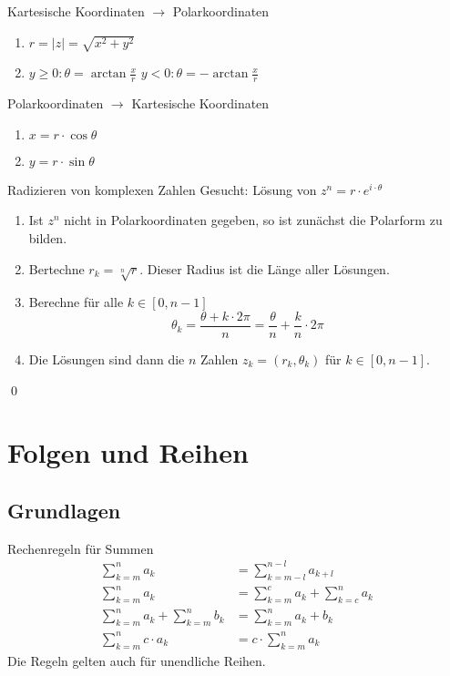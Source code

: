 \documentclass[german]{spicker}
\renewcommand{\abs}[1]{\left| #1 \right|}
\begin{document}
\begin{algo}{Kartesische Koordinaten $\to$ Polarkoordinaten}
    \begin{enumerate}
        \item $r = \abs{z} = \sqrt{x^2 + y^2}$
        \item
              \subitem $y \geq 0 : \theta = \arctan \frac{x}{r}$
              \subitem $y < 0 : \theta = -\arctan \frac{x}{r}$
    \end{enumerate}
\end{algo}

\begin{algo}{Polarkoordinaten $\to$ Kartesische Koordinaten}
    \begin{enumerate}
        \item $x = r \cdot \cos \theta$
        \item $y = r \cdot \sin \theta$
    \end{enumerate}
\end{algo}

\begin{algo}{Radizieren von komplexen Zahlen}
    Gesucht: Lösung von $z^n = r \cdot e^{i\cdot \theta}$
    \begin{enumerate}
        \item Ist $z^n$ nicht in Polarkoordinaten gegeben, so ist zunächst die Polarform zu bilden.
        \item Bertechne $r_k = \sqrt[n]{r}$. Dieser Radius ist die Länge aller Lösungen.
        \item Berechne für alle $k \in [0, n-1]$
              $$
                  \theta_k = \frac{\theta + k\cdot 2\pi}{n} = \frac{\theta}{n} + \frac{k}{n} \cdot 2\pi
              $$
        \item Die Lösungen sind dann die $n$ Zahlen $z_k = (r_k, \theta_k)$ für $k \in [0, n-1]$.
    \end{enumerate}
    \qed
\end{algo}

\section{Folgen und Reihen}

\subsection{Grundlagen}
\begin{bonus}{Rechenregeln für Summen}
    $$
        \begin{aligned}
            \sum_{k=m}^n a_k                    & = \sum_{k=m-l}^{n-l} a_{k+l}          \\
            \sum_{k=m}^n a_k                    & = \sum_{k=m}^c a_k + \sum_{k=c}^n a_k \\
            \sum_{k=m}^n a_k + \sum_{k=m}^n b_k & = \sum_{k=m}^n a_k + b_k              \\
            \sum_{k=m}^n c\cdot a_k             & = c\cdot\sum_{k=m}^n a_k
        \end{aligned}
    $$
    Die Regeln gelten auch für unendliche Reihen.
\end{bonus}
\end{document}
